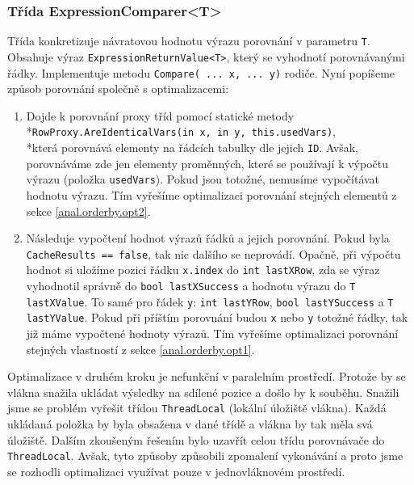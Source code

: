 \subsubsection{Třída ExpressionComparer<T>} \label{impl.orderby.opts}

Třída konkretizuje návratovou hodnotu výrazu porovnání v parametru \texttt{T}.
Obsahuje výraz \texttt{ExpressionReturnValue<T>}, který se vyhodnotí porovnávanými řádky.
Implementuje metodu \texttt{Compare( ... x, ... y)} rodiče.
Nyní popíšeme způsob porovnání společně s optimalizacemi:

\begin{enumerate}
\item Dojde k porovnání proxy tříd pomocí statické metody \\*\texttt{RowProxy.AreIdenticalVars(in x, in y, this.usedVars)}, \\*která
porovnává elementy na řádcích tabulky dle jejich \texttt{ID}.
Avšak, porovnáváme zde jen elementy proměnných, které se používají k výpočtu výrazu (položka \texttt{usedVars}).
Pokud jsou totožné, nemusíme vypočítávat hodnotu výrazu.
Tím vyřešíme optimalizaci porovnání stejných elementů z sekce \ref{anal.orderby.opt2}.

\item Následuje vypočtení hodnot výrazů řádků a jejich porovnání.
Pokud byla \texttt{CacheResults == false}, tak nic dalšího se neprovádí.
Opačně, při výpočtu hodnot si uložíme pozici řádku \texttt{x.index} do \texttt{int lastXRow}, zda se výraz vyhodnotil správně do \texttt{bool lastXSuccess} a hodnotu výrazu do \texttt{T lastXValue}.
To samé pro řádek \texttt{y}: \texttt{int lastYRow}, \texttt{bool lastYSuccess} a \texttt{T lastYValue}.
Pokud při příštím porovnání budou \texttt{x} nebo \texttt{y} totožné řádky, tak již máme vypočtené hodnoty výrazů. 
Tím vyřešíme optimalizaci porovnání stejných vlastností z sekce \ref{anal.orderby.opt1}.
\end{enumerate}

Optimalizace v druhém kroku je nefunkční v paralelním prostředí.
Protože by se vlákna snažila ukládat výsledky na sdílené pozice a došlo by k souběhu.
Snažili jsme se problém vyřešit třídou \texttt{ThreadLocal} (lokální úložiště vlákna).
Každá ukládaná položka by byla obsažena v dané třídě a vlákna by tak měla svá úložiště.
Dalším zkoušeným řešením bylo uzavřít celou třídu porovnávače do \texttt{ThreadLocal}.
Avšak, tyto způsoby způsobili zpomalení vykonávání a proto jsme se rozhodli optimalizaci využívat pouze v jednovláknovém prostředí.

